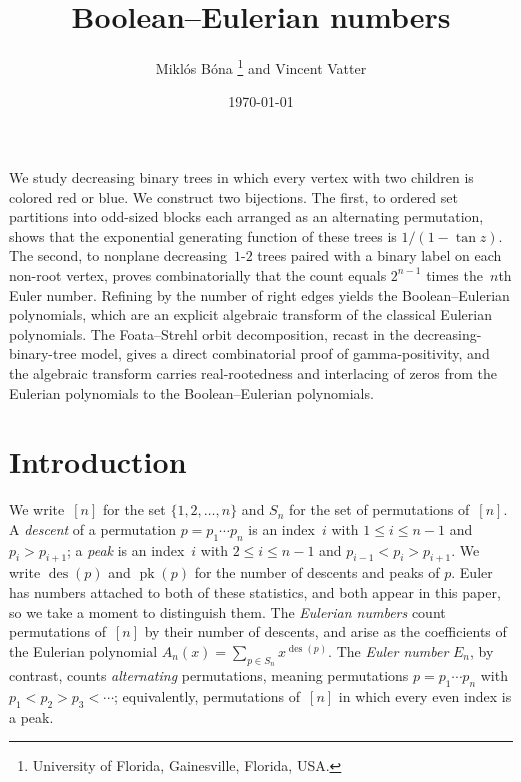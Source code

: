 \documentclass[10pt]{article}
\title{\sc Boolean--Eulerian numbers}
\author{
	Mikl\'os B\'ona%
	\footnote{University of Florida, Gainesville, Florida, USA.}
	\quad
	and
	\quad
	Vincent Vatter%
	\footnotemark[1]
}
\date{\today}
\theoremstyle{plain}
\renewenvironment{abstract}
  {
    \begin{list}{}%
      {\setlength{\rightmargin}{1in}%
       \setlength{\leftmargin}{1in}}%
    \item[]\ignorespaces\begin{small}
  }
  {
    \end{small}\unskip\end{list}
  }
\DeclareMathOperator{\des}{des}
\DeclareMathOperator{\pk}{pk}
\begin{document}
\maketitle


\begin{abstract}
We study decreasing binary trees in which every vertex with two children is colored red or blue. We construct two bijections. The first, to ordered set partitions into odd-sized blocks each arranged as an alternating permutation, shows that the exponential generating function of these trees is $1/(1-\tan z)$. The second, to nonplane decreasing~$1$-$2$ trees paired with a binary label on each non-root vertex, proves combinatorially that the count equals $2^{n-1}$ times the~$n$th Euler number. Refining by the number of right edges yields the Boolean--Eulerian polynomials, which are an explicit algebraic transform of the classical Eulerian polynomials. The Foata--Strehl orbit decomposition, recast in the decreasing-binary-tree model, gives a direct combinatorial proof of gamma-positivity, and the algebraic transform carries real-rootedness and interlacing of zeros from the Eulerian polynomials to the Boolean--Eulerian polynomials.
\end{abstract}

\pagestyle{main}


\section{Introduction}
\label{sec:intro}

We write~$[n]$ for the set $\{1, 2, \ldots, n\}$ and $S_n$ for the set of permutations of~$[n]$. A \emph{descent} of a permutation $p = p_1 \cdots p_n$ is an index~$i$ with $1 \leq i \leq n-1$ and $p_i > p_{i+1}$; a \emph{peak} is an index~$i$ with $2 \leq i \leq n-1$ and $p_{i-1} < p_i > p_{i+1}$. We write $\des(p)$ and $\pk(p)$ for the number of descents and peaks of $p$. Euler has numbers attached to both of these statistics, and both appear in this paper, so we take a moment to distinguish them. The \emph{Eulerian numbers} count permutations of~$[n]$ by their number of descents, and arise as the coefficients of the Eulerian polynomial $A_n(x) = \sum_{p \in S_n} x^{\des(p)}$. The \emph{Euler number} $E_n$, by contrast, counts \emph{alternating} permutations, meaning permutations $p = p_1 \cdots p_n$ with $p_1 < p_2 > p_3 < \cdots$; equivalently, permutations of~$[n]$ in which every even index is a peak.
\end{document}
